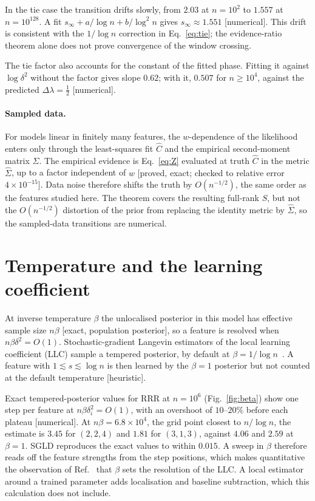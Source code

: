 \documentclass[11pt]{article}
\newcommand{\status}[1]{\textsf{[#1]}}
\begin{document}
In the tie case the transition drifts slowly, from $2.03$ at $n=10^2$ to $1.557$ at $n=10^{128}$.
A fit $s_\infty+a/\log n+b/\log^2n$ gives $s_\infty\approx1.551$ \status{numerical}.
This drift is consistent with the $1/\log n$ correction in Eq.~\eqref{eq:tie}; the evidence-ratio theorem alone does not prove convergence of the window crossing.

The tie factor also accounts for the constant of the fitted phase.
Fitting it against $\log\delta^2$ without the factor gives slope $0.62$; with it, $0.507$ for $n\ge10^4$, against the predicted $\Delta\lambda=\tfrac12$ \status{numerical}.

\paragraph{Sampled data.}
For models linear in finitely many features, the $w$-dependence of the likelihood enters only through the least-squares fit $\hat C$ and the empirical second-moment matrix $\hat\Sigma$.
The empirical evidence is Eq.~\eqref{eq:Z} evaluated at truth $\hat C$ in the metric $\hat\Sigma$, up to a factor independent of $w$ \status{proved, exact; checked to relative error $4\times10^{-15}$}.
Data noise therefore shifts the truth by $O(n^{-1/2})$, the same order as the features studied here.
The theorem covers the resulting full-rank $S$, but not the $O(n^{-1/2})$ distortion of the prior from replacing the identity metric by $\hat\Sigma$, so the sampled-data transitions are numerical.

\section{Temperature and the learning coefficient}

At inverse temperature $\beta$ the unlocalised posterior in this model has effective sample size $n\beta$ \status{exact, population posterior}, so a feature is resolved when $n\beta\delta^2=O(1)$.
Stochastic-gradient Langevin estimators of the local learning coefficient (LLC) sample a tempered posterior, by default at $\beta=1/\log n$~\cite{LFWMW23}.
A feature with $1\lesssim s\lesssim\log n$ is then learned by the $\beta=1$ posterior but not counted at the default temperature \status{heuristic}.

Exact tempered-posterior values for RRR at $n=10^6$ (Fig.~\ref{fig:beta}) show one step per feature at $n\beta\delta_i^2=O(1)$, with an overshoot of $10$--$20\%$ before each plateau \status{numerical}.
At $n\beta=6.8\times10^4$, the grid point closest to $n/\log n$, the estimate is $3.45$ for $(2,2,4)$ and $1.81$ for $(3,1,3)$, against $4.06$ and $2.59$ at $\beta=1$.
SGLD reproduces the exact values to within $0.015$.
A sweep in $\beta$ therefore reads off the feature strengths from the step positions, which makes quantitative the observation of Ref.~\cite{CM25} that $\beta$ sets the resolution of the LLC.
A local estimator around a trained parameter adds localisation and baseline subtraction, which this calculation does not include.
\end{document}
